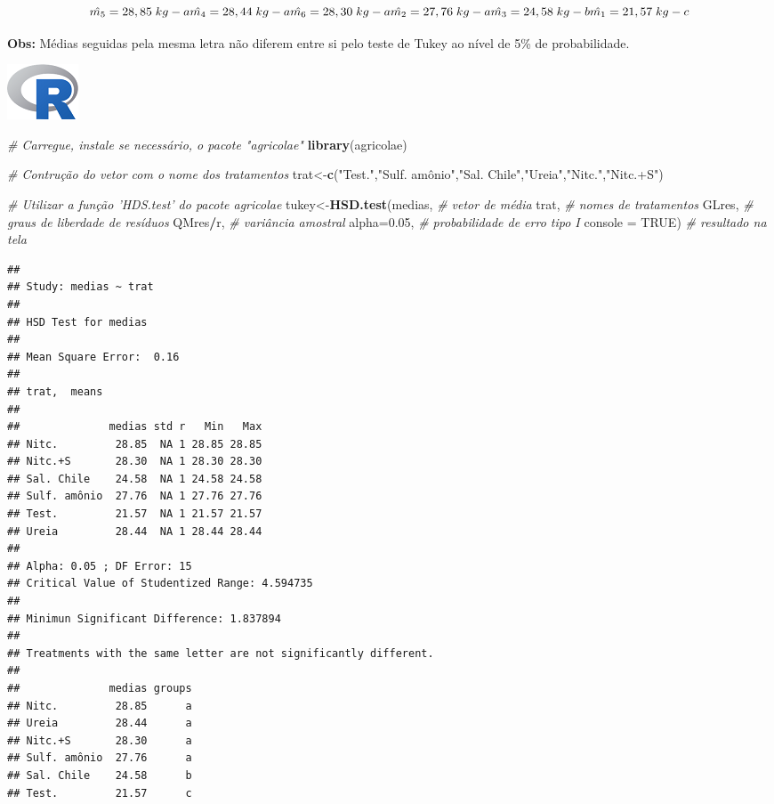 \documentclass[
]{book}
\newenvironment{Shaded}{\begin{snugshade}}{\end{snugshade}}
\newcommand{\CommentTok}[1]{\textcolor[rgb]{0.56,0.35,0.01}{\textit{#1}}}
\newcommand{\DataTypeTok}[1]{\textcolor[rgb]{0.13,0.29,0.53}{#1}}
\newcommand{\FloatTok}[1]{\textcolor[rgb]{0.00,0.00,0.81}{#1}}
\newcommand{\KeywordTok}[1]{\textcolor[rgb]{0.13,0.29,0.53}{\textbf{#1}}}
\newcommand{\NormalTok}[1]{#1}
\newcommand{\OperatorTok}[1]{\textcolor[rgb]{0.81,0.36,0.00}{\textbf{#1}}}
\newcommand{\OtherTok}[1]{\textcolor[rgb]{0.56,0.35,0.01}{#1}}
\newcommand{\StringTok}[1]{\textcolor[rgb]{0.31,0.60,0.02}{#1}}
\begin{document}
\[
\hat{m_5} = 28,85\;kg - a\\
\hat{m_4} = 28,44\;kg - a\\
\hat{m_6} = 28,30\;kg - a\\
\hat{m_2} = 27,76\;kg - a\\
\hat{m_3} = 24,58\;kg - b\\
\hat{m_1} = 21,57\;kg - c
\]

\textbf{Obs:} Médias seguidas pela mesma letra não diferem entre si pelo teste de Tukey ao nível de 5\% de probabilidade.

\includegraphics{Rlogo.png}

\begin{Shaded}
\begin{Highlighting}[]
\CommentTok{# Carregue, instale se necessário, o pacote "agricolae"}
\KeywordTok{library}\NormalTok{(agricolae)}

\CommentTok{# Contrução do vetor com o nome dos tratamentos}
\NormalTok{trat<-}\KeywordTok{c}\NormalTok{(}\StringTok{"Test."}\NormalTok{,}\StringTok{"Sulf. amônio"}\NormalTok{,}\StringTok{"Sal. Chile"}\NormalTok{,}\StringTok{"Ureia"}\NormalTok{,}\StringTok{"Nitc."}\NormalTok{,}\StringTok{"Nitc.+S"}\NormalTok{)}

\CommentTok{# Utilizar a função 'HDS.test' do pacote agricolae}
\NormalTok{tukey<-}\KeywordTok{HSD.test}\NormalTok{(medias, }\CommentTok{# vetor de média}
\NormalTok{                trat, }\CommentTok{# nomes de tratamentos}
\NormalTok{                GLres, }\CommentTok{# graus de liberdade de resíduos}
\NormalTok{                QMres}\OperatorTok{/}\NormalTok{r, }\CommentTok{# variância amostral}
                \DataTypeTok{alpha=}\FloatTok{0.05}\NormalTok{, }\CommentTok{# probabilidade de erro tipo I}
                \DataTypeTok{console =} \OtherTok{TRUE}\NormalTok{) }\CommentTok{# resultado na tela}
\end{Highlighting}
\end{Shaded}

\begin{verbatim}
## 
## Study: medias ~ trat
## 
## HSD Test for medias 
## 
## Mean Square Error:  0.16 
## 
## trat,  means
## 
##              medias std r   Min   Max
## Nitc.         28.85  NA 1 28.85 28.85
## Nitc.+S       28.30  NA 1 28.30 28.30
## Sal. Chile    24.58  NA 1 24.58 24.58
## Sulf. amônio  27.76  NA 1 27.76 27.76
## Test.         21.57  NA 1 21.57 21.57
## Ureia         28.44  NA 1 28.44 28.44
## 
## Alpha: 0.05 ; DF Error: 15 
## Critical Value of Studentized Range: 4.594735 
## 
## Minimun Significant Difference: 1.837894 
## 
## Treatments with the same letter are not significantly different.
## 
##              medias groups
## Nitc.         28.85      a
## Ureia         28.44      a
## Nitc.+S       28.30      a
## Sulf. amônio  27.76      a
## Sal. Chile    24.58      b
## Test.         21.57      c
\end{verbatim}
\end{document}
